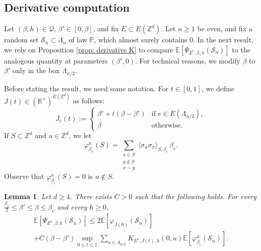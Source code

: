 \documentclass[11pt,a4paper]{article}
\numberwithin{equation}{section}
\theoremstyle{plain}
\newtheorem{Lem}[Thm]{Lemma}
\theoremstyle{definition}
\begin{document}
\subsection{Derivative computation}


Let $(\beta,h)\in \mathcal Q$, $\beta'\in [0,\beta]$, and fix $E\subset E(\mathbb Z^d)$. Let $n\geq 1$ be even, and fix a random set $\mathcal S_n\subset \Lambda_n$ of law $\mathbb P$, which almost surely contains $0$. In the next result, we rely on Proposition \ref{prop: derivative K} to compare $\mathbb E[\Psi_{E^c,\beta,h}(\mathcal S_n)]$ to the analogous quantity at parameters $(\beta',0)$. For technical reasons, we modify $\beta$ to $\beta'$ only in the box $\Lambda_{n/2}$.

Before stating the result, we need some notation. For $t\in [0,1]$, we define $J(t)\in (\mathbb R^+)^{E(\mathbb Z^d)}$ as follows: 
\begin{equation}\label{eq: def J}
	J_e(t):=\left\{
			\begin{array}{ll}
				\beta'+t(\beta-\beta') & \mbox{if } e\in E(\Lambda_{n/2}), \\
				\beta & \mbox{otherwise}.
			\end{array}
			\right.
\end{equation}
If $S\subset \mathbb Z^d$ and $u\in \mathbb Z^d$, we let
\begin{equation}
	\varphi_{\beta_c}^u(S)=\sum_{\substack{x\in S\\y\notin S\\x \sim y}}\langle \sigma_u\sigma_x\rangle_{S,\beta_c}\, \beta_c.
\end{equation}
Observe that $\varphi^u_{\beta_c}(S)=0$ is $u \notin S$.


\begin{Lem}\label{lem: derivative} Let $d\geq 4$. There exists $C>0$ such that the following holds. For every $\tfrac{\beta_c}{2}\leq \beta'\leq \beta\leq \beta_c$ and every $h\geq 0$,
\begin{multline}\label{eq: derivative}
	\mathbb E[\Psi_{E^c,\beta,h}(\mathcal S_n)]\leq 2\mathbb E[\varphi_{J(0)}(\mathcal S_n)]\\+C(\beta-\beta') \sup_{0\leq t\leq 1}\sum_{u\in \Lambda_{n/2}}K_{E^c,J(t),h}(0,u)\mathbb E[\varphi_{\beta_c}^u(\mathcal S_n)].
\end{multline}
	
\end{Lem}
\end{document}
